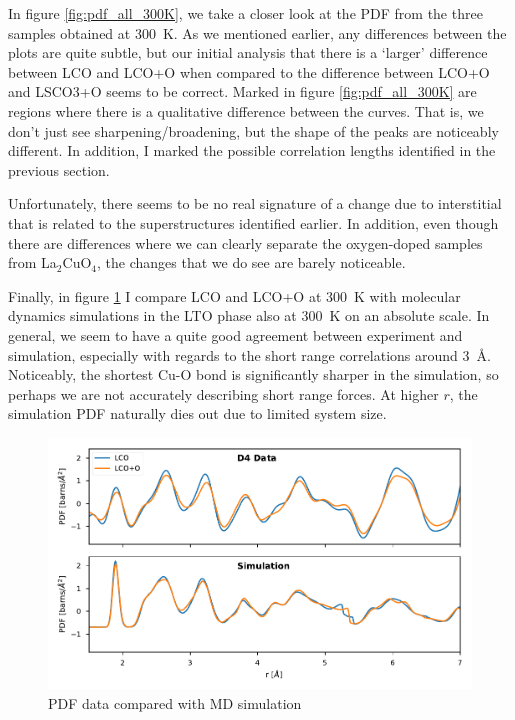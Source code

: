 In figure \ref{fig:pdf_all_300K}, we take a closer look at the PDF from the three samples obtained at \SI{300}{\kelvin}. As we mentioned earlier, any differences between the plots are quite subtle, but our initial analysis that there is a `larger' difference between LCO and LCO+O when compared to the difference between LCO+O and LSCO3+O seems to be correct. Marked in figure \ref{fig:pdf_all_300K} are regions where there is a qualitative difference between the curves. That is, we don't just see sharpening/broadening, but the shape of the peaks are noticeably different. In addition, I marked the possible correlation lengths identified in the previous section.

Unfortunately, there seems to be no real signature of a change due to interstitial that is related to the superstructures identified earlier. In addition, even though there are differences where we can clearly separate the oxygen-doped samples from La$_2$CuO$_4$, the changes that we do see are barely noticeable.

Finally, in figure \ref{fig:pdf_sim_comparision} I compare LCO and LCO+O at \SI{300}{\kelvin} with molecular dynamics simulations in the LTO phase also at \SI{300}{\kelvin} on an absolute scale. In general, we seem to have a quite good agreement between experiment and simulation, especially with regards to the short range correlations around \SI{3}{\angstrom}. Noticeably, the shortest Cu-O bond is significantly sharper in the simulation, so perhaps we are not accurately describing short range forces. At higher $r$, the simulation PDF naturally dies out due to limited system size.

\begin{figure}
    \centering
    \includegraphics[width=\textwidth]{fig/pdf/pdf_simulation_experiment_compare.pdf}
    \caption[PDF data compared with MD simulation]{PDF data compared with MD simulation}
    \label{fig:pdf_sim_comparision}
\end{figure}

